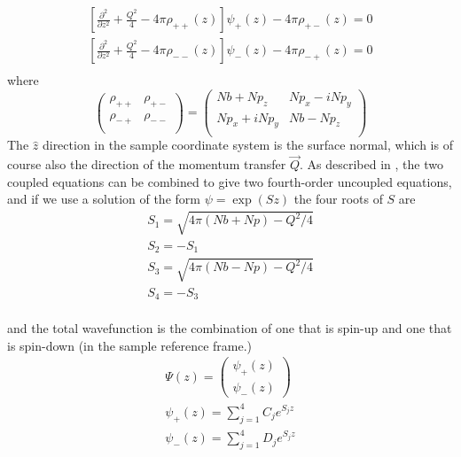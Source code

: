 \documentclass[%
 reprint,
 amsmath,
 amssymb,
 aps,
 prl,
 lengthcheck,%
]{revtex4-1}
\begin{document}
\begin{eqnarray}
    \left[ \frac{\partial^2}{\partial z^2} + \frac{Q^2}{4} - 4\pi\rho_{++}(z) \right ] \psi_{+}(z) - 4\pi\rho_{+-}(z) = 0 \nonumber \\
    \left[ \frac{\partial^2}{\partial z^2} + \frac{Q^2}{4} - 4\pi\rho_{--}(z) \right ] \psi_{-}(z) - 4\pi\rho_{-+}(z) = 0 \nonumber \\
\end{eqnarray}
where 
\begin{equation}
  \begin{pmatrix} 
    \rho_{++} & \rho_{+-} \\ 
    \rho_{-+} & \rho_{--} \\ 
  \end{pmatrix}
= \begin{pmatrix}
    Nb + Np_z & Np_x - iNp_y \\
    Np_x + iNp_y & Nb - Np_z \\
  \end{pmatrix}
\end{equation}
The $\hat z$ direction in the sample coordinate system is the surface normal, 
which is of course also the direction of the momentum transfer $\vec Q$.  
As described in \cite{PNRMajkrzakChapter}, the two coupled equations can be 
combined to give two fourth-order uncoupled equations, and if we use a 
solution of the form $\psi=\exp(Sz)$ the four roots of $S$ are
\begin{equation}
  \begin{array}{l}
  S_1 = \sqrt{4\pi(Nb + Np) - Q^2/4} \\
  S_2 = -S_1 \\
  S_3 = \sqrt{4\pi(Nb - Np) - Q^2/4} \\
  S_4 = -S_3 \\
  \end{array}
\end{equation}

and the total wavefunction is the combination of one that is spin-up and one
that is spin-down (in the sample reference frame.) 
\begin{equation}
  \begin{array}{l}
  \displaystyle \Psi(z) = \begin{pmatrix} \psi_{+}(z) \\ \psi_{-}(z) \end{pmatrix}\\
  \displaystyle \psi_{+}(z) = \sum_{j=1}^{4} C_j e^{S_j z} \\
  \displaystyle \psi_{-}(z) = \sum_{j=1}^{4} D_j e^{S_j z} \\
  \end{array}
\end{equation}
\end{document}
